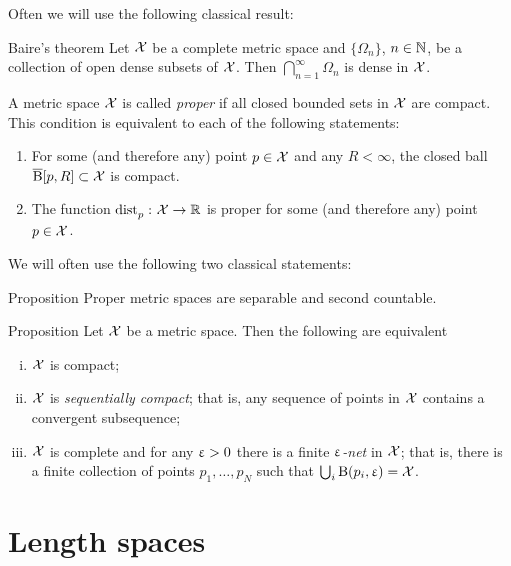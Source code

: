 Often we will use the following classical result:

\begin{thm}{Baire's theorem}
Let $\mathcal{X}$ be a complete metric space 
and $\{\Omega_n\}$, $n\in \NN$, be a collection of open dense subsets of $\mathcal{X}$.
Then $\bigcap_{n=1}^\infty\Omega_n$ is dense in $\mathcal{X}$.
\end{thm}
 

A metric space $\mathcal{X}$ is called \emph{proper} if all closed bounded sets in $\mathcal{X}$ are compact. 
This condition is equivalent to each of the following statements:
\begin{enumerate}
\item For some (and therefore any) point $p\in \spc{X}$ and any $R<\infty$, 
the closed ball $\cBall[p,R]\subset\spc{X}$ is compact. 
\item The function $\distfun{p}{}{}\:\spc{X}\to\RR$ is proper for some (and therefore any) point $p\in \spc{X}$.
\end{enumerate}

We will often use the following two classical statements:

\begin{thm}{Proposition}
Proper metric spaces are separable and second countable.
\end{thm}



\begin{thm}{Proposition}\label{compact=seq-compact}
Let $\mathcal{X}$ be a metric space. Then the following are equivalent
\begin{enumerate}[i)]
\item $\mathcal{X}$ is compact;
\item $\mathcal{X}$ is \emph{sequentially compact}; that is, any sequence of points in $\mathcal{X}$ contains a convergent subsequence;
\item $\mathcal{X}$ is complete and for any $\upvarepsilon>0$ there is a finite \emph{$\upvarepsilon$-net} in $\mathcal{X}$; that is, there is a finite collection of points $p_1,\ldots,p_{N}$ such that $\bigcup_i\mathrm{B}{}(p_i,\upvarepsilon)=\mathcal{X}$.
\end{enumerate}
\end{thm}

\section{Length spaces}\label{sec:intrinsic}

